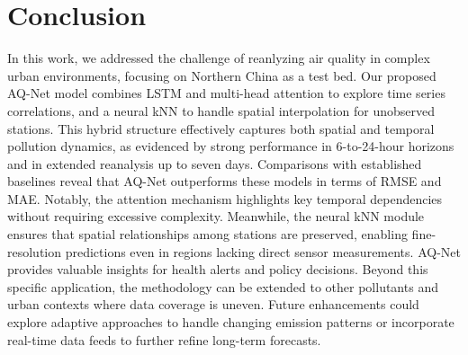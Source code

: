 \section{Conclusion}
\label{conclusion}
In this work, we addressed the challenge of reanlyzing air quality in complex urban environments, focusing on Northern China as a test bed. Our proposed AQ-Net model combines LSTM and multi-head attention to explore time series correlations, and a neural kNN to handle spatial interpolation for unobserved stations. This hybrid structure effectively captures both spatial and temporal pollution dynamics, as evidenced by strong performance in 6-to-24-hour horizons and in extended reanalysis up to seven days. Comparisons with established baselines reveal that AQ-Net outperforms these models in terms of RMSE and MAE. Notably, the attention mechanism highlights key temporal dependencies without requiring excessive complexity. Meanwhile, the neural kNN module ensures that spatial relationships among stations are preserved, enabling fine-resolution predictions even in regions lacking direct sensor measurements. AQ-Net provides valuable insights for health alerts and policy decisions. Beyond this specific application, the methodology can be extended to other pollutants and urban contexts where data coverage is uneven. Future enhancements could explore adaptive approaches to handle changing emission patterns or incorporate real-time data feeds to further refine long-term forecasts.